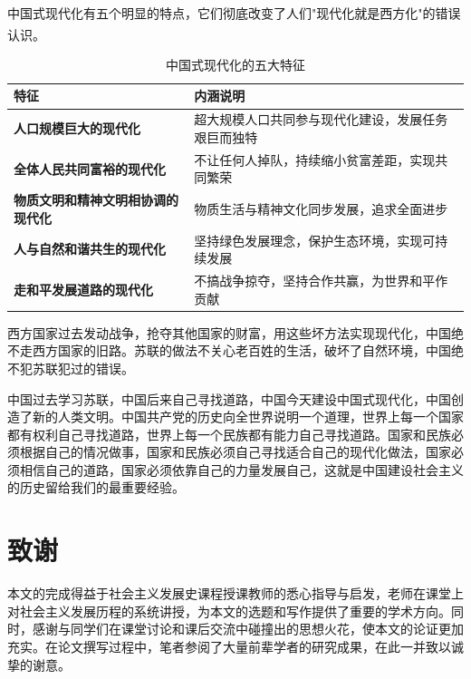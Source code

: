 \documentclass[12pt, a4paper]{ctexart}
\newcommand{\upcite}[1]{\textsuperscript{\cite{#1}}}
\numberwithin{table}{section}
\numberwithin{figure}{section}
\begin{document}
中国式现代化有五个明显的特点，它们彻底改变了人们"现代化就是西方化"的错误认识\upcite{ref16}。

\vspace{0.5em}
\begin{table}[htbp]
\centering
\caption{中国式现代化的五大特征}
\begin{tabularx}{0.92\textwidth}{>{\bfseries\centering\arraybackslash}p{3.8cm} X}
\toprule
\textbf{特征} & \textbf{内涵说明} \\
\midrule
人口规模巨大的现代化 & 超大规模人口共同参与现代化建设，发展任务艰巨而独特 \\
\addlinespace
全体人民共同富裕的现代化 & 不让任何人掉队，持续缩小贫富差距，实现共同繁荣 \\
\addlinespace
物质文明和精神文明相协调的现代化 & 物质生活与精神文化同步发展，追求全面进步 \\
\addlinespace
人与自然和谐共生的现代化 & 坚持绿色发展理念，保护生态环境，实现可持续发展 \\
\addlinespace
走和平发展道路的现代化 & 不搞战争掠夺，坚持合作共赢，为世界和平作贡献 \\
\bottomrule
\end{tabularx}
\end{table}西方国家过去发动战争，抢夺其他国家的财富，用这些坏方法实现现代化，中国绝不走西方国家的旧路。苏联的做法不关心老百姓的生活，破坏了自然环境，中国绝不犯苏联犯过的错误。

中国过去学习苏联，中国后来自己寻找道路，中国今天建设中国式现代化，中国创造了新的人类文明。中国共产党的历史向全世界说明一个道理，世界上每一个国家都有权利自己寻找道路，世界上每一个民族都有能力自己寻找道路。国家和民族必须根据自己的情况做事，国家和民族必须自己寻找适合自己的现代化做法，国家必须相信自己的道路，国家必须依靠自己的力量发展自己，这就是中国建设社会主义的历史留给我们的最重要经验。

\vspace{1.5em}
\section*{致\quad 谢}
{\kaishu
本文的完成得益于社会主义发展史课程授课教师的悉心指导与启发，老师在课堂上对社会主义发展历程的系统讲授，为本文的选题和写作提供了重要的学术方向。同时，感谢与同学们在课堂讨论和课后交流中碰撞出的思想火花，使本文的论证更加充实。在论文撰写过程中，笔者参阅了大量前辈学者的研究成果，在此一并致以诚挚的谢意。
}

\vspace{1em}
\end{document}
